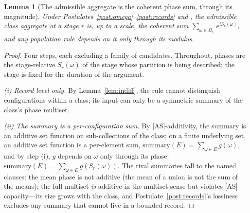 \documentclass[11pt]{article}
\newtheorem{lemma}{Lemma}
\theoremstyle{definition}
\theoremstyle{remark}
\begin{document}
\begin{lemma}[The admissible aggregate is the coherent phase sum, through its magnitude]\label{lem:phasesym}
Under Postulates~\ref{post:omega}--\ref{post:records} and {\upshape[AS]}, the admissible class aggregate at a stage $r$ is, up to a scale, the coherent sum $\sum_{\omega \in \Omega_{r_i}} e^{iS_r(\omega)}$, and any population rule depends on it only through its modulus.
\end{lemma}
\begin{proof}
Four steps, each excluding a family of candidates. Throughout, phases are the stage-relative $S_r(\omega)$ of the stage whose partition is being described; the stage is fixed for the duration of the argument.

\emph{(i) Record level only.} By Lemma~\ref{lem:indiff}, the rule cannot distinguish configurations within a class; its input can only be a symmetric summary of the class's phase multiset.

\emph{(ii) The summary is a per-configuration sum.} By [AS]-additivity, the summary is an additive set function on sub-collections of the class; on a finite underlying set, an additive set function is a per-element sum, $\mathrm{summary}(E) = \sum_{\omega \in E} g(\omega)$, and by step (i), $g$ depends on $\omega$ only through its phase: $\mathrm{summary}(E) = \sum_{\omega \in E} g(S_r(\omega))$. The rival summaries fall to the named clauses: the mean phase is not additive (the mean of a union is not the sum of the means); the full multiset \emph{is} additive in the multiset sense but violates [AS]-capacity---its size grows with the class, and Postulate~\ref{post:records}'s lossiness excludes any summary that cannot live in a bounded record.


\end{proof}
\end{document}
